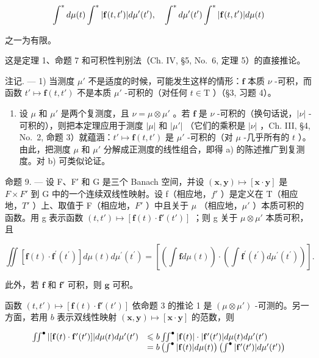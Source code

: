 \[
\int^ {*} d \mu (t) \int^ {*} | {\bf f} (t, t ^ {\prime}) | d \mu^ {\prime} (t ^ {\prime}), \quad \int^ {*} d \mu^ {\prime} (t ^ {\prime}) \int^ {*} | {\bf f} (t, t ^ {\prime}) | d \mu (t)
\]

之一为有限。

这是定理 1、命题 7 和可积性判别法（Ch. IV, §5, No.~6, 定理 5）的直接推论。

注记. --- 1) 当测度 \(\mu'\) 不是适度的时候，可能发生这样的情形：\(\mathbf{f}\) 本质 \(\nu\) -可积，而函数 \(t' \mapsto \mathbf{f}(t, t')\) 不是本质 \(\mu'\) -可积的（对任何 \(t \in \mathrm{T}\) ）（§3, 习题 4）。

\begin{enumerate}
\def\labelenumi{\arabic{enumi})}
\setcounter{enumi}{1}
\tightlist
\item
  设 \(\mu\) 和 \(\mu'\) 是两个复测度，且 \(\nu = \mu \otimes \mu'\) 。若 \(\mathbf{f}\) 是 \(\nu\) -可积的（换句话说，\(|\nu|\) -可积的），则把本定理应用于测度 \(|\mu|\) 和 \(|\mu'|\) （它们的乘积是 \(|\nu|\) ，Ch. III, §4, No.~2, 命题 3）就蕴涵：\(t' \mapsto \mathbf{f}(t, t')\) 是 \(\mu'\) -可积的（对 \(\mu\) -几乎所有的 \(t\) ）。由此，把测度 \(\mu\) 和 \(\mu'\) 分解成正测度的线性组合，即得 a) 的陈述推广到复测度。对 b) 可类似论证。
\end{enumerate}

命题 9. --- 设 F、F′ 和 G 是三个 Banach 空间，并设 \((\mathbf{x},\mathbf{y})\mapsto[\mathbf{x}\cdot\mathbf{y}]\) 是 \(F\times F'\) 到 G 中的一个连续双线性映射。设 f（相应地，\(f'\) ）是定义在 T（相应地，\(T'\) ）上、取值于 F（相应地，\(F'\) ）中且关于 \(\mu\) （相应地，\(\mu'\) ）本质可积的函数。用 g 表示函数 \((t,t')\mapsto[\mathbf{f}(t)\cdot\mathbf{f}'(t')]\) ；则 g 关于 \(\mu\otimes\mu'\) 本质可积，且

\[
\iint \left[ \mathbf {f} (t) \cdot \mathbf {f} ^ {\prime} \left(t ^ {\prime}\right) \right] d \mu (t) d \mu^ {\prime} \left(t ^ {\prime}\right) = \left[ \left(\int \mathbf {f} d \mu (t)\right) \cdot \left(\int \mathbf {f} ^ {\prime} \left(t ^ {\prime}\right) d \mu^ {\prime} \left(t ^ {\prime}\right)\right) \right].\tag{14}
\]

此外，若 \(\mathbf{f}\) 和 \(\mathbf{f}'\) 可积，则 \(\mathbf{g}\) 可积。

函数 \((t, t') \mapsto [\mathbf{f}(t) \cdot \mathbf{f}'(t')]\) 依命题 3 的推论 1 是 \((\mu \otimes \mu')\) -可测的。另一方面，若用 \(b\) 表示双线性映射 \((\mathbf{x}, \mathbf{y}) \mapsto [\mathbf{x} \cdot \mathbf{y}]\) 的范数，则

\[
\begin{array}{r l} \iint^ {\bullet} | [ \mathbf {f} (t) \cdot \mathbf {f} ^ {\prime} (t ^ {\prime}) ] | d \mu (t) d \mu^ {\prime} (t ^ {\prime}) & \leqslant b \iint^ {\bullet} | \mathbf {f} (t) | \cdot | \mathbf {f} ^ {\prime} (t ^ {\prime}) | d \mu (t) d \mu^ {\prime} (t ^ {\prime}) \\ & = b \left(\int^ {\bullet} | \mathbf {f} (t) | d \mu (t)\right) \left(\int^ {\bullet} | \mathbf {f} ^ {\prime} (t ^ {\prime}) | d \mu^ {\prime} (t ^ {\prime})\right) \end{array}
\]

